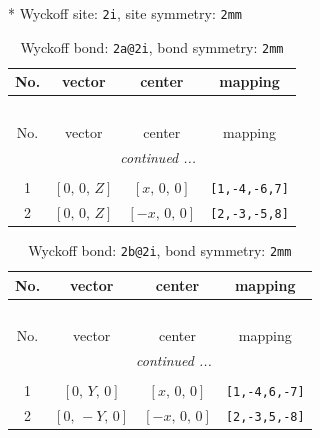 \documentclass[fleqn,8pt]{jsarticle}
\begin{document}
* Wyckoff site: {\tt 2i}, site symmetry: {\tt 2mm}
\renewcommand{\arraystretch}{1.2}
\begin{longtable}{cccc}
\caption{Wyckoff bond: {\tt 2a@2i}, bond symmetry: {\tt 2mm}}
 \\
 \hline \hline
No. & vector & center & mapping \\ \hline \endfirsthead

\multicolumn{3}{l}{\tablename\ \thetable{}} \\
 \hline \hline
No. & vector & center & mapping \\ \hline \endhead

 \hline \hline
\multicolumn{3}{r}{\footnotesize\it continued ...} \\ \endfoot

 \hline \hline
\multicolumn{3}{r}{} \\ \endlastfoot

1 & $\left[ 0,\, 0,\, Z \right]$ & $\left[ x,\, 0,\, 0 \right]$ & {\tt [1,-4,-6,7]} \\ \hline
2 & $\left[ 0,\, 0,\, Z \right]$ & $\left[ - x,\, 0,\, 0 \right]$ & {\tt [2,-3,-5,8]} \\
\end{longtable}
\renewcommand{\arraystretch}{1.2}
\begin{longtable}{cccc}
\caption{Wyckoff bond: {\tt 2b@2i}, bond symmetry: {\tt 2mm}}
 \\
 \hline \hline
No. & vector & center & mapping \\ \hline \endfirsthead

\multicolumn{3}{l}{\tablename\ \thetable{}} \\
 \hline \hline
No. & vector & center & mapping \\ \hline \endhead

 \hline \hline
\multicolumn{3}{r}{\footnotesize\it continued ...} \\ \endfoot

 \hline \hline
\multicolumn{3}{r}{} \\ \endlastfoot

1 & $\left[ 0,\, Y,\, 0 \right]$ & $\left[ x,\, 0,\, 0 \right]$ & {\tt [1,-4,6,-7]} \\ \hline
2 & $\left[ 0,\, - Y,\, 0 \right]$ & $\left[ - x,\, 0,\, 0 \right]$ & {\tt [2,-3,5,-8]} \\
\end{longtable}
\renewcommand{\arraystretch}{1.2}
\end{document}

